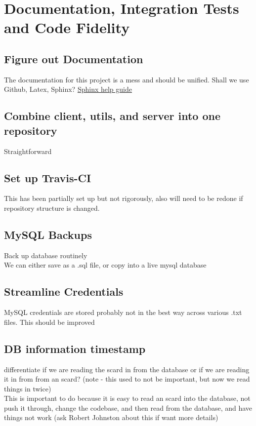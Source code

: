 \section{Documentation, Integration Tests and Code Fidelity}
    \subsection{Figure out Documentation}
        The documentation for this project is a mess and should be unified. Shall we use Github, Latex, Sphinx?
        \href{https://medium.com/@richdayandnight/a-simple-tutorial-on-how-to-document-your-python-project-using-sphinx-and-rinohtype-177c22a15b5b}{Sphinx help guide}

    \subsection{Combine client, utils, and server into one repository}
        Straightforward
    \subsection{Set up Travis-CI}
        This has been partially set up but not rigorously, also will need to be redone if repository structure is changed.
    \subsection{MySQL Backups}
        Back up database routinely\\
        We can either save as a .sql file, or copy into a live mysql database
    \subsection{Streamline Credentials}
        MySQL credentials are stored probably not in the best way across various .txt files. This should be improved
    \subsection{DB information timestamp}
        differentiate if we are reading the scard in from the database or if we are reading it in from from an scard? (note - this used to not be important, but now we read things in twice)\\
        This is important to do because it is easy to read an scard into the database, not push it through, change the codebase, and then read from the database, and have things not work (ask Robert Johnston about this if want more details)
    

